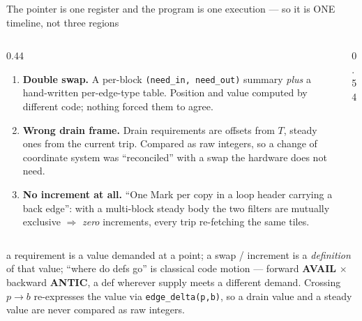 \begin{frame}{The pointer is one register and the program is one execution --- so it is ONE timeline, not three regions}
\begin{columns}[T]
\begin{column}{0.44\textwidth}
\footnotesize
{}
\begin{enumerate}\itemsep1pt
\item \textbf{Double swap.} A per-block \texttt{(need\_in, need\_out)} summary \emph{plus} a hand-written
  per-edge-type table. Position and value computed by different code; nothing forced them to agree.
\item \textbf{Wrong drain frame.} Drain requirements are offsets from $T$, steady ones from the current
  trip. Compared as raw integers, so a change of coordinate system was ``reconciled'' with a swap the
  hardware does not need.
\item \textbf{No increment at all.} ``One Mark per copy in a loop header carrying a back edge'': with a
  multi-block steady body the two filters are mutually exclusive $\Rightarrow$ \emph{zero} increments,
  every trip re-fetching the same tiles.
\end{enumerate}
\end{column}
\begin{column}{0.54\textwidth}
\centering
{}
\end{column}
\end{columns}
\vspace{1mm}
\footnotesize
{} a requirement is a value demanded at a point; a swap / increment is a \emph{definition} of
that value; ``where do defs go'' is classical code motion --- forward \textbf{AVAIL} $\times$ backward
\textbf{ANTIC}, a def wherever supply meets a different demand. Crossing $p\!\to\!b$ re-expresses the value via
\texttt{edge\_delta(p,b)}, so a drain value and a steady value are never compared as raw integers.
\end{frame}
